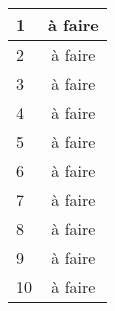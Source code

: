 \begin{tabular}{| l | c |}
	\hline
	1 & à faire \\ \hline
	2 & à faire \\ \hline
	3 & à faire \\ \hline
	4 & à faire \\ \hline
	5 & à faire \\ \hline
	6 & à faire \\ \hline
	7 & à faire \\ \hline
	8 & à faire \\ \hline
	9 & à faire \\ \hline
	10 & à faire \\ \hline
\end{tabular}
